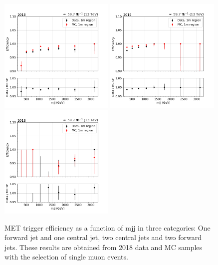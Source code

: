 \begin{figure}[hbp]
    \begin{center}
        \includegraphics[width=0.49\textwidth]{fig/efficiency/trigger/met/mjj/data_mc_comparison_1m_2018_one_jet_forward_one_jet_central.png}
        \includegraphics[width=0.49\textwidth]{fig/efficiency/trigger/met/mjj/data_mc_comparison_1m_2018_two_central_jets.png} \\
        \includegraphics[width=0.49\textwidth]{fig/efficiency/trigger/met/mjj/data_mc_comparison_1m_2018_two_forward_jets.png}
    \end{center}
    \caption{MET trigger efficiency as a function of mjj in three categories: One forward jet and one central jet, two central jets and
            two forward jets. These results are obtained from 2018 data and MC samples with the selection of single muon events.}   
    \label{fig:eff_mjj_2018_1m}
\end{figure}

